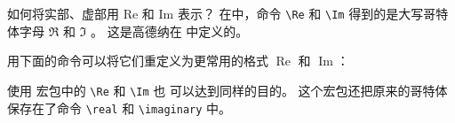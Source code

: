 \begin{myQA}{如何将实部、虚部用 Re 和 Im 表示？}
	在\LaTeXTeX 中，命令 \verb|\Re| 和 \verb|\Im| 得到的是大写哥特体字母
	$\Re$  和 $\Im$ 。
	这是高德纳在  中定义的。
	
	用下面的命令可以将它们重定义为更常用的格式 $\operatorname{Re}$
	和 $\operatorname{Im}$：
\begin{myCode}
\renewcommand{\Re}{\operatorname{Re}}
\renewcommand{\Im}{\operatorname{Im}}
\end{myCode}
	
	使用   宏包中的 \verb|\Re| 和 \verb|\Im| 也
	可以达到同样的目的。
	这个宏包还把原来的哥特体保存在了命令 \verb|\real| 和 \verb|\imaginary| 中。
	 
	
\end{myQA}


